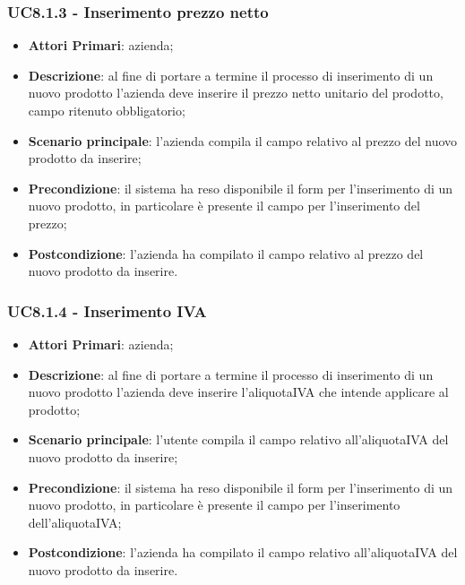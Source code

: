\subsubsection{UC8.1.3 - Inserimento prezzo netto}
\begin{itemize}
	\item \textbf{Attori Primari}: azienda;
	\item \textbf{Descrizione}: al fine di portare a termine il processo di inserimento di un nuovo prodotto l'azienda deve inserire il prezzo netto unitario del prodotto, campo ritenuto obbligatorio;
	\item \textbf{Scenario principale}: l'azienda compila il campo relativo al prezzo del nuovo prodotto da inserire;
	\item \textbf{Precondizione}: il sistema ha reso disponibile il form per l'inserimento di un nuovo prodotto, in particolare è presente il campo per l'inserimento del prezzo;
	\item \textbf{Postcondizione}: l'azienda ha compilato il campo relativo al prezzo del nuovo prodotto da inserire.
\end{itemize}
\subsubsection{UC8.1.4 - Inserimento IVA}
\begin{itemize}
	\item \textbf{Attori Primari}: azienda;
	\item \textbf{Descrizione}: al fine di portare a termine il processo di inserimento di un nuovo prodotto l'azienda deve inserire l'aliquota\glosp IVA che intende applicare al prodotto;
	\item \textbf{Scenario principale}: l'utente compila il campo relativo all'aliquota\glosp IVA del nuovo prodotto da inserire;
	\item \textbf{Precondizione}: il sistema ha reso disponibile il form per l'inserimento di un nuovo prodotto, in particolare è presente il campo per l'inserimento dell'aliquota\glosp IVA;
	\item \textbf{Postcondizione}: l'azienda ha compilato il campo relativo all'aliquota\glosp IVA del nuovo prodotto da inserire.
\end{itemize}
